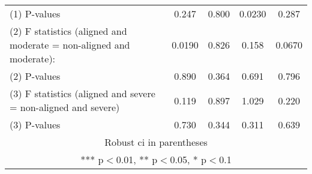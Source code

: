 \begin{tabular}{lcccc}
(1) \hspace{1mm} P-values & 0.247 & 0.800 & 0.0230 & 0.287 \\
(2) F statistics (aligned and moderate = non-aligned and moderate): & 0.0190 & 0.826 & 0.158 & 0.0670 \\
(2) \hspace{1mm} P-values & 0.890 & 0.364 & 0.691 & 0.796 \\
(3) F statistics (aligned and severe = non-aligned and severe) & 0.119 & 0.897 & 1.029 & 0.220 \\
 (3) \hspace{1mm} P-values & 0.730 & 0.344 & 0.311 & 0.639 \\ \hline
\multicolumn{5}{c}{ Robust ci in parentheses} \\
\multicolumn{5}{c}{ *** p$<$0.01, ** p$<$0.05, * p$<$0.1} \\
\end{tabular}

